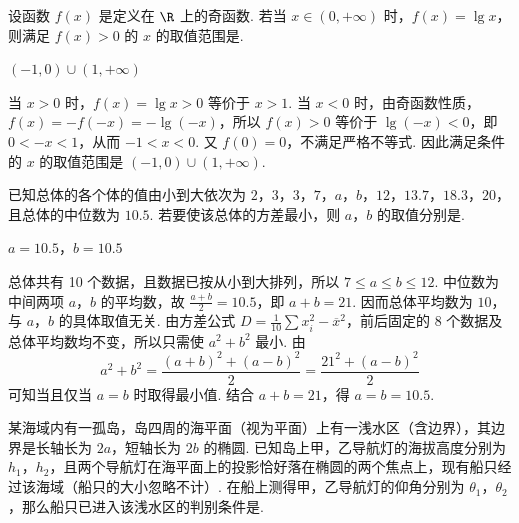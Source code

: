 \begin{problem}
设函数 \( f(x) \) 是定义在 \( \R \) 上的奇函数. 若当 \( x \in (0, +\infty) \) 时，\( f(x) = \lg x \)，则满足 \( f(x) > 0 \) 的 \( x \) 的取值范围是\fillinblank{}.
\end{problem}

\begin{answer}
\((-1,0)\cup(1,+\infty)\)
\end{answer}

\begin{solution}
当 \(x>0\) 时，\(f(x)=\lg x>0\) 等价于 \(x>1\). 当 \(x<0\) 时，由奇函数性质，\(f(x)=-f(-x)=-\lg(-x)\)，所以 \(f(x)>0\) 等价于 \(\lg(-x)<0\)，即 \(0<-x<1\)，从而 \(-1<x<0\). 又 \(f(0)=0\)，不满足严格不等式. 因此满足条件的 \(x\) 的取值范围是 \((-1,0)\cup(1,+\infty)\).
\end{solution}

\begin{problem}
已知总体的各个体的值由小到大依次为 \(2\)，\(3\)，\(3\)，\(7\)，\(a\)，\(b\)，\(12\)，\(13.7\)，\(18.3\)，\(20\)，且总体的中位数为 \(10.5\). 若要使该总体的方差最小，则 \(a\)，\(b\) 的取值分别是\fillinblank{}.
\end{problem}

\begin{answer}
\(a=10.5\)，\(b=10.5\)
\end{answer}

\begin{solution}
总体共有 10 个数据，且数据已按从小到大排列，所以 \(7\leqslant a\leqslant b\leqslant12\). 中位数为中间两项 \(a\)，\(b\) 的平均数，故 \(\frac{a+b}{2}=10.5\)，即 \(a+b=21\). 因而总体平均数为 \(10\)，与 \(a\)，\(b\) 的具体取值无关. 由方差公式 \(D=\frac1{10}\sum x_i^2-\overline{x}^{2}\)，前后固定的 8 个数据及总体平均数均不变，所以只需使 \(a^2+b^2\) 最小. 由
\[
a^2+b^2=\frac{(a+b)^2+(a-b)^2}{2}=\frac{21^2+(a-b)^2}{2}
\]
可知当且仅当 \(a=b\) 时取得最小值. 结合 \(a+b=21\)，得 \(a=b=10.5\).
\end{solution}

\begin{problem}
某海域内有一孤岛，岛四周的海平面（视为平面）上有一浅水区（含边界），其边界是长轴长为 \(2a\)，短轴长为 \(2b\) 的椭圆. 已知岛上甲，乙导航灯的海拔高度分别为 \(h_1\)，\(h_2\)，且两个导航灯在海平面上的投影恰好落在椭圆的两个焦点上，现有船只经过该海域（船只的大小忽略不计）. 在船上测得甲，乙导航灯的仰角分别为 \(\theta_1\)，\(\theta_2\)，那么船只已进入该浅水区的判别条件是\fillinblank{}.
\end{problem}

